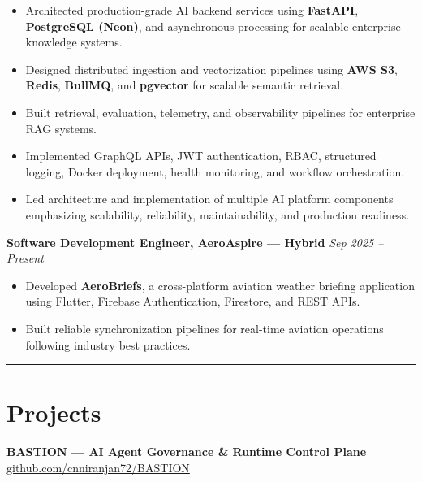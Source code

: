 \documentclass[a4paper,11pt]{article}
\newcommand{\sectionline}{
    \vspace{-9pt}
    \noindent\rule{\linewidth}{0.5pt}
    \vspace{-15pt}
}
\begin{document}
\begin{itemize}

\item Architected production-grade AI backend services using \textbf{FastAPI}, \textbf{PostgreSQL (Neon)}, and asynchronous processing for scalable enterprise knowledge systems.

\item Designed distributed ingestion and vectorization pipelines using \textbf{AWS S3}, \textbf{Redis}, \textbf{BullMQ}, and \textbf{pgvector} for scalable semantic retrieval. 
\item Built retrieval, evaluation, telemetry, and observability pipelines for enterprise RAG systems.

\item Implemented GraphQL APIs, JWT authentication, RBAC, structured logging, Docker deployment, health monitoring, and workflow orchestration.
\item Led architecture and implementation of multiple AI platform components emphasizing scalability, reliability, maintainability, and production readiness.

\end{itemize}

\vspace{1.5pt}

\textbf{Software Development Engineer, AeroAspire — Hybrid}
\hfill
\textit{Sep 2025 -- Present}

\begin{itemize}

\item Developed \textbf{AeroBriefs}, a cross-platform aviation weather briefing application using Flutter, Firebase Authentication, Firestore, and REST APIs.

\item Built reliable synchronization pipelines for real-time aviation operations following industry best practices.

\end{itemize}

\sectionline


\section*{Projects}

\textbf{BASTION — AI Agent Governance \& Runtime Control Plane}
\hfill
\href{https://github.com/cnniranjan72/BASTION}{github.com/cnniranjan72/BASTION}
\end{document}
